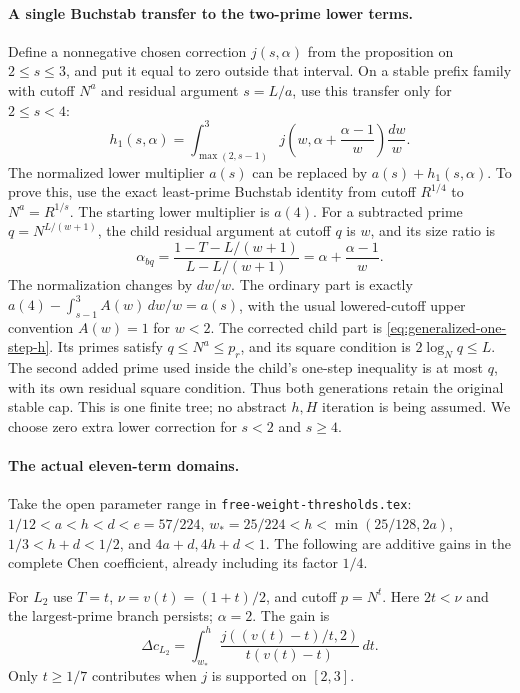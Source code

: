 \paragraph{A single Buchstab transfer to the two-prime lower terms.}
Define a nonnegative chosen correction $j(s,\alpha)$ from the
proposition on $2\le s\le3$, and put it equal to zero outside that
interval. On a stable prefix family with cutoff $N^a$ and residual
argument $s=L/a$, use this transfer only for $2\le s<4$:
\begin{equation}\label{eq:generalized-one-step-h}
 h_1(s,\alpha)=\int_{\max(2,s-1)}^3
 j\left(w,\alpha+\frac{\alpha-1}{w}\right)\frac{dw}{w}.
\end{equation}
The normalized lower multiplier $a(s)$ can be replaced by
$a(s)+h_1(s,\alpha)$. To prove this, use the exact least-prime
Buchstab identity from cutoff $R^{1/4}$ to $N^a=R^{1/s}$.
The starting lower multiplier is $a(4)$. For a subtracted prime
$q=N^{L/(w+1)}$, the child residual argument at cutoff $q$ is $w$,
and its size ratio is
\[
 \alpha_{bq}=\frac{1-T-L/(w+1)}{L-L/(w+1)}
            =\alpha+\frac{\alpha-1}{w}.
\]
The normalization changes by $dw/w$. The ordinary part is exactly
$a(4)-\int_{s-1}^3 A(w)\,dw/w=a(s)$, with the usual lowered-cutoff
upper convention $A(w)=1$ for $w<2$. The corrected child part is
\eqref{eq:generalized-one-step-h}. Its primes satisfy
$q\le N^a\le p_r$, and its square condition is $2\log_Nq\le L$.
The second added prime used inside the child's one-step inequality
is at most $q$, with its own residual square condition. Thus both
generations retain the original stable cap. This is one finite tree;
no abstract $h,H$ iteration is being assumed. We choose zero extra
lower correction for $s<2$ and $s\ge4$.

\paragraph{The actual eleven-term domains.}
Take the open parameter range in \texttt{free-weight-thresholds.tex}:
$1/12<a<h<d<e=57/224$, $w_*=25/224<h<\min(25/128,2a)$,
$1/3<h+d<1/2$, and $4a+d,4h+d<1$.
The following are additive gains in the complete Chen coefficient,
already including its factor $1/4$.

For $L_2$ use $T=t$, $\nu=v(t)=(1+t)/2$, and cutoff $p=N^t$.
Here $2t<\nu$ and the largest-prime branch persists; $\alpha=2$.
The gain is
\[
 \Delta c_{L_2}=\int_{w_*}^h
 \frac{j((v(t)-t)/t,2)}{t(v(t)-t)}\,dt.
\]
Only $t\ge1/7$ contributes when $j$ is supported on $[2,3]$.

